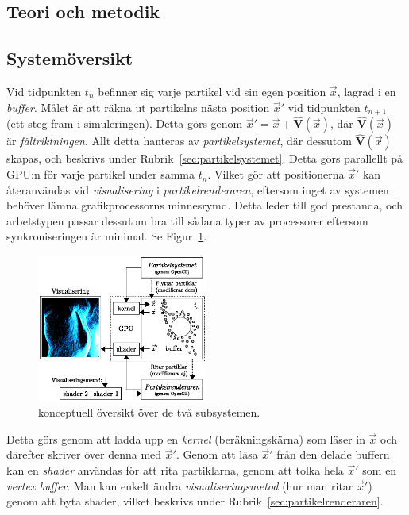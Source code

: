 \documentclass[a4paper]{article}
\begin{document}
\begin{multicols}{2}
    \vspace{-0.5cm}
    \section{Teori och metodik}
    \vspace{-0.3cm}
    \subsection{Systemöversikt} \label{sec:system}

    Vid tidpunkten \(t_n\) befinner sig varje partikel vid sin egen position \(\vec{x}\), lagrad i en \emph{buffer}. Målet är att räkna ut partikelns nästa position \(\vec{x}'\) vid tidpunkten \(t_{n+1}\) (ett steg fram i simuleringen). Detta görs genom \(\vec{x}' = \vec{x} + \mathbf{\hat{V}}(\vec{x})\), där \(\mathbf{\hat{V}}(\vec{x})\) är \emph{fältriktningen}. Allt detta hanteras av \emph{partikelsystemet}, där dessutom \(\mathbf{\hat{V}}(\vec{x})\) skapas, och beskrivs under Rubrik~\ref{sec:partikelsystemet}. Detta görs parallellt på GPU:n för varje partikel under samma \(t_n\). Vilket gör att positionerna \(\vec{x}'\) kan återanvändas vid \emph{visualisering} i \emph{partikelrenderaren}, eftersom inget av systemen behöver lämna grafikprocessorns minnesrymd. Detta leder till god prestanda, och arbetstypen passar dessutom bra till sådana typer av processorer eftersom synkroniseringen är minimal. Se Figur~\ref{fig:system}.

    \begin{figure}[H]
    \center
    \includegraphics[width=0.5\textwidth]{share/System.eps}
    \caption{konceptuell översikt över de två subsystemen.}
    \label{fig:system}
    \end{figure}

    Detta görs genom att ladda upp en \emph{kernel} (beräkningskärna) som läser in \(\vec{x}\) och därefter skriver över denna med \(\vec{x}'\). Genom att läsa \(\vec{x}'\) från den delade buffern kan en \emph{shader} användas för att rita partiklarna, genom att tolka hela \(\vec{x}'\) som en \emph{vertex buffer}. Man kan enkelt ändra \emph{visualiseringsmetod} (hur man ritar \(\vec{x}'\)) genom att byta shader, vilket beskrivs under Rubrik~\ref{sec:partikelrenderaren}.


\end{multicols}
\end{document}
